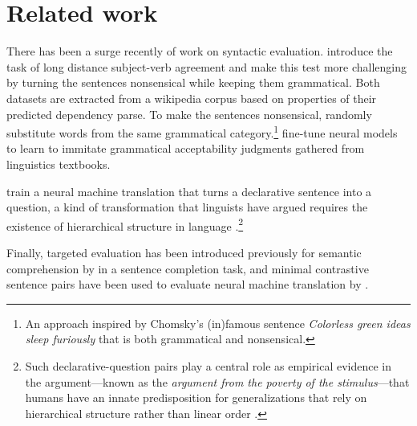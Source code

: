 \section{Related work}
  There has been a surge recently of work on syntactic evaluation. \citet{linzen2016syntax} introduce the task of long distance subject-verb agreement and \citet{gulordava2018colorless} make this test more challenging by turning the sentences nonsensical while keeping them grammatical. Both datasets are extracted from a wikipedia corpus based on properties of their predicted dependency parse. To make the sentences nonsensical, \citet{gulordava2018colorless} randomly substitute words from the same grammatical category.\footnote{An approach inspired by Chomsky's (in)famous sentence \textit{Colorless green ideas sleep furiously} that is both grammatical and nonsensical.} \citet{warstadt2018acceptability} fine-tune neural models to learn to immitate grammatical acceptability judgments gathered from linguistics textbooks.

  \citet{mccoy2018revisiting} train a neural machine translation that turns a declarative sentence into a question, a kind of transformation that linguists have argued requires the existence of hierarchical structure in language \citep{everaert2015structures}.\footnote{Such declarative-question pairs play a central role as empirical evidence in the argument---known as the \textit{argument from the poverty of the stimulus}---that humans have an innate predisposition for generalizations that rely on hierarchical structure rather than linear order \citep{chomsky1980rules}.}

  Finally, targeted evaluation has been introduced previously for semantic comprehension by \citet{zweig2011microsoft} in a sentence completion task, and minimal contrastive sentence pairs have been used to evaluate neural machine translation by \citet{sennrich2017grammatical}.
